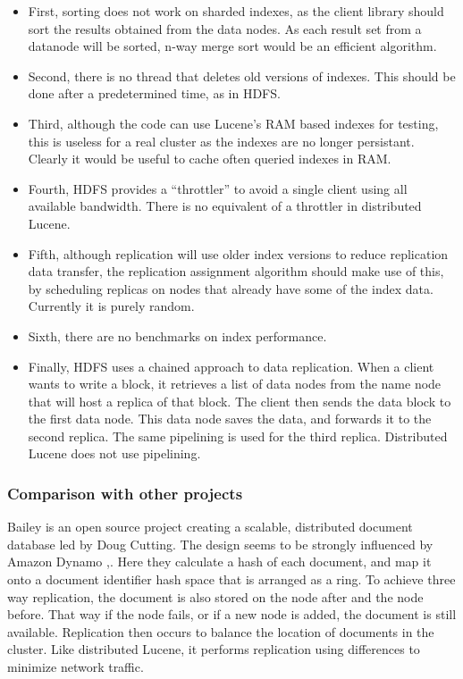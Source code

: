 \documentclass[a4paper,10pt]{article}
\begin{document}
\begin{itemize}
\item First, sorting does not work on sharded indexes, as the client library should sort the results obtained from the data nodes. As each result set from a datanode will be sorted, n-way merge sort would be an efficient algorithm.
\item Second, there is no thread that deletes old versions of indexes. This should be done after a predetermined time, as in HDFS. 
\item Third, although the code can use Lucene's RAM based indexes for testing, this is useless for a real cluster as the indexes are no longer persistant. Clearly it would be useful to cache often queried indexes in RAM. 
\item Fourth, HDFS provides a ``throttler'' to avoid a single client using all available bandwidth. There is no equivalent of a throttler in distributed Lucene. 
\item Fifth, although replication will use older index versions to reduce replication data transfer, the replication assignment algorithm should make use of this, by scheduling replicas on nodes that already have some of the index data. Currently it is purely random. 
\item Sixth, there are no benchmarks on index performance. 
\item Finally, HDFS uses a chained approach to data replication. When a client wants to write a block, it retrieves a list of data nodes from the name node that will host a replica of that block. The client then sends the data block to the first data node. This data node saves the data, and forwards it to the second replica. The same pipelining is used for the third replica. Distributed Lucene does not use pipelining. 
\end{itemize}

\subsubsection{Comparison with other projects}

Bailey \cite{bailey} is an open source project creating a scalable, distributed document database led by Doug Cutting. The design seems to be strongly influenced by Amazon Dynamo \cite{vogelBlog},\cite{dynamo}. Here they calculate a hash of each document, and map it onto a document identifier hash space that is arranged as a ring. To achieve three way replication, the document is also stored on the node after and the node before. That way if the node fails, or if a new node is added, the document is still available. Replication then occurs to balance the location of documents in the cluster. Like distributed Lucene, it performs replication using differences to minimize network traffic.
\end{document}
